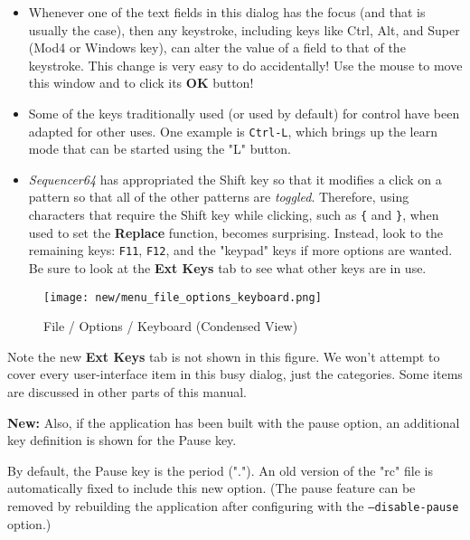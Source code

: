    \begin{itemize}
      \item Whenever one of the text fields in this dialog has the focus (and
         that is usually the case), then any keystroke, including keys like
         Ctrl, Alt, and Super (Mod4 or Windows key), can alter the value of a
         field to that of the keystroke.  This change is very easy to do
         accidentally!  \textsf{Use the mouse} to move this window and to click
         its \textbf{OK} button!
      \item Some of the keys traditionally used (or used by default) for
         control have been adapted for other uses.  One example is
         \texttt{Ctrl-L}, which brings up the learn mode that can be started
         using the "L" button.
      \item \textsl{Sequencer64} has appropriated the
          Shift key so that it
         modifies a click on a pattern so that all of the other patterns are
         \textsl{toggled}.  Therefore, using characters that require the Shift
         key while clicking, such as \texttt{\{} and \texttt{\}}, when used
         to set the \textbf{Replace} function, becomes surprising.
         Instead, look to the remaining keys: \texttt{F11}, \texttt{F12},
         and the "keypad" keys if more options are wanted.  Be sure to
         look at the \textbf{Ext Keys} tab to see what other keys are in use.
   \end{itemize}

\begin{figure}[H]
   \centering 
   \texttt{[image: new/menu\_file\_options\_keyboard.png]}
   \caption{File / Options / Keyboard (Condensed View)}
   \label{fig:seq64_menu_file_options_keyboard}
\end{figure}

   Note the new \textbf{Ext Keys} tab is not shown in this figure.
   We won't attempt to cover every user-interface item in this busy
   dialog, just the categories.  Some items are discussed in other parts of
   this manual.

   \textbf{New:}
   Also, if the application has been built with the pause option, an
   additional key definition is shown for the Pause key.

   By default, the Pause key is the period (".").  An old version of
   the "rc" file is automatically fixed to include this new option.
   (The pause feature can be removed by rebuilding the application
   after configuring with the \texttt{--disable-pause} option.)


